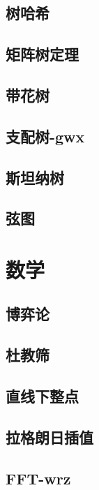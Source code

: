 \documentclass[titlepage,a4paper,10pt]{article}
\begin{document}
\begin{multicols}{2}
\begin{spacing}{0.8}
			\subsection{树哈希}
				
			\subsection{矩阵树定理}
				
			\subsection{带花树}
				
			\subsection{支配树-gwx}
				
			\subsection{斯坦纳树}
				
			\subsection{弦图}
				
		\section{数学}
			\subsection{博弈论}
				
			\subsection{杜教筛}
				
			\subsection{直线下整点}
				
			\subsection{拉格朗日插值}
				
			\subsection{FFT-wrz}
				

\end{spacing}
\end{multicols}
\end{document}
